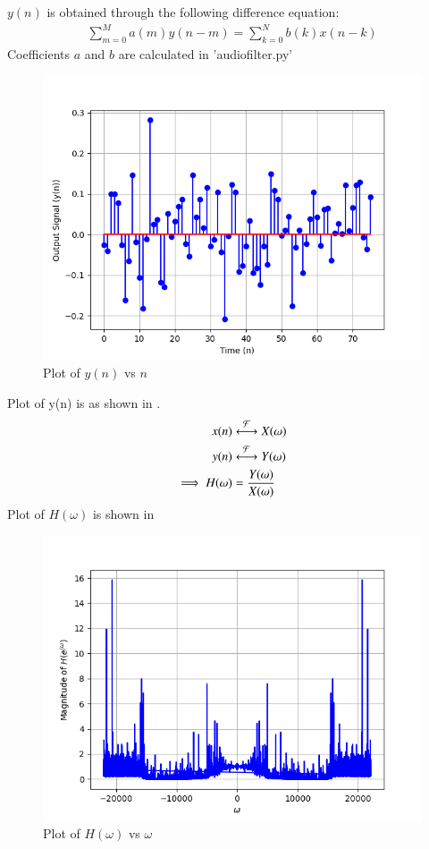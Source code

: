 \documentclass[journal,12pt,twocolumn]{IEEEtran}
\theoremstyle{remark}
\begin{document}
$y(n)$ is obtained through the following difference equation:
\begin{align}
    \sum_{m=0}^{M}a(m)y(n-m) = \sum_{k=0}^{N}b(k)x(n-k)
\end{align}
Coefficients $a$ and $b$ are calculated in 'audiofilter.py'
\begin{figure}[!h]
    \centering
    \includegraphics[width = \columnwidth]{figs/y_plot.png}
    \caption{Plot of $y(n)$ vs $n$}
    \label{fig:y_plot}
\end{figure}

Plot of y(n) is as shown in .
\begin{align}
    x(n) &\system{F} X(\omega)\\
    y(n) &\system{F} Y(\omega)\\
    \implies H(\omega) &= \frac{Y(\omega)}{X(\omega)} 
\end{align}
Plot of $H(\omega)$ is shown in 

\begin{figure}[!h]
    \centering
    \includegraphics[width = \columnwidth]{figs/H_plot.png}
    \caption{Plot of $H(\omega)$ vs $\omega$}
    \label{fig:H_plot}
\end{figure}
\end{document}
